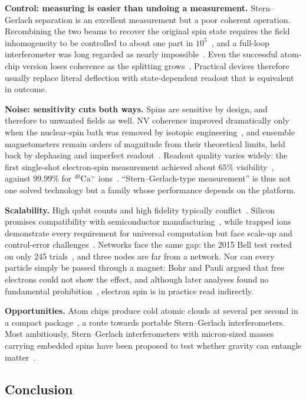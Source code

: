 \textbf{Control: measuring is easier than undoing a measurement.} Stern--Gerlach separation is an excellent measurement but a poor coherent operation. Recombining the two beams to recover the original spin state requires the field inhomogeneity to be controlled to about one part in $10^5$~\cite{englert1988}, and a full-loop interferometer was long regarded as nearly impossible~\cite{margalit2021}. Even the successful atom-chip version loses coherence as the splitting grows~\cite{margalit2021}. Practical devices therefore usually replace literal deflection with state-dependent readout that is equivalent in outcome.

\textbf{Noise: sensitivity cuts both ways.} Spins are sensitive by design, and therefore to unwanted fields as well. NV coherence improved dramatically only when the nuclear-spin bath was removed by isotopic engineering~\cite{balasubramanian2009}, and ensemble magnetometers remain orders of magnitude from their theoretical limits, held back by dephasing and imperfect readout~\cite{barry2020}. Readout quality varies widely: the first single-shot electron-spin measurement achieved about $65\%$ visibility~\cite{elzerman2004}, against $99.99\%$ for $^{40}$Ca$^+$ ions~\cite{myerson2008}. ``Stern--Gerlach-type measurement'' is thus not one solved technology but a family whose performance depends on the platform.

\textbf{Scalability.} High qubit counts and high fidelity typically conflict~\cite{philips2022}. Silicon promises compatibility with semiconductor manufacturing~\cite{burkard2023,xue2022}, while trapped ions demonstrate every requirement for universal computation but face scale-up and control-error challenges~\cite{bruzewicz2019}. Networks face the same gap: the 2015 Bell test rested on only 245 trials~\cite{hensen2015}, and three nodes are far from a network. Nor can every particle simply be passed through a magnet: Bohr and Pauli argued that free electrons could not show the effect, and although later analyses found no fundamental prohibition~\cite{garraway2002,batelaan1997}, electron spin is in practice read indirectly.

\textbf{Opportunities.} Atom chips produce cold atomic clouds at several per second in a compact package~\cite{keil2016}, a route towards portable Stern--Gerlach interferometers. Most ambitiously, Stern--Gerlach interferometers with micron-sized masses carrying embedded spins have been proposed to test whether gravity can entangle matter~\cite{bose2017}.

\subsection{Conclusion}

